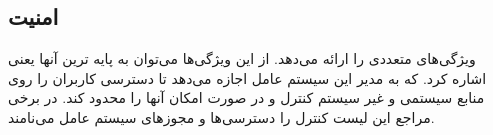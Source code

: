 \documentclass[20pt, a4paper]{article}
\begin{document}
\subsection{امنیت}

ویژگی‌های متعددی را ارائه می‌دهد. از این ویژگی‌ها می‌توان به پایه ترین آنها یعنی
 اشاره کرد. که به مدیر این سیستم عامل اجازه
می‌دهد تا دسترسی کاربران را روی منابع سیستمی و غیر سیستم کنترل و در صورت امکان
آنها را محدود کند. در برخی مراجع این لیست کنترل را دسترسی‌ها و مجوز‌های سیستم
عامل می‌نامند.
\end{document}
